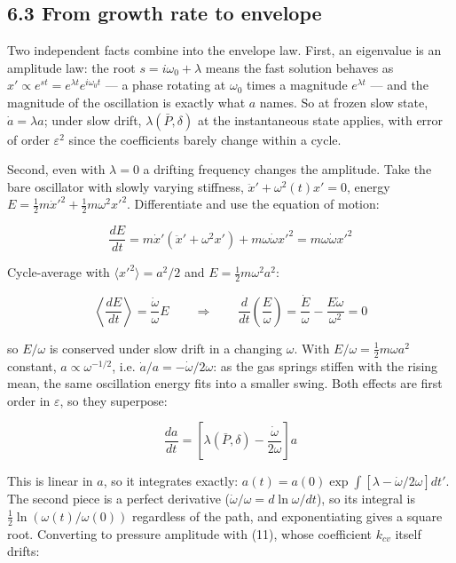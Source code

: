 \documentclass[11pt]{article}
\begin{document}
\subsection*{6.3 From growth rate to envelope}

Two independent facts combine into the envelope law. First, an eigenvalue is an amplitude law: the root $s = i\omega_0 + \lambda$ means the fast solution behaves as $x' \propto e^{st} = e^{\lambda t}e^{i\omega_0 t}$ --- a phase rotating at $\omega_0$ times a magnitude $e^{\lambda t}$ --- and the magnitude of the oscillation is exactly what $a$ names. So at frozen slow state, $\dot a = \lambda a$; under slow drift, $\lambda(\bar P, \delta)$ at the instantaneous state applies, with error of order $\varepsilon^2$ since the coefficients barely change within a cycle.

Second, even with $\lambda = 0$ a drifting frequency changes the amplitude. Take the bare oscillator with slowly varying stiffness, $\ddot x' + \omega^2(t)x' = 0$, energy $E = \frac{1}{2}m\dot x'^2 + \frac{1}{2}m\omega^2x'^2$. Differentiate and use the equation of motion:

\[
\frac{dE}{dt} = m\dot x'\left(\ddot x' + \omega^2x'\right) + m\omega\dot\omega x'^2 = m\omega\dot\omega x'^2
\]

Cycle-average with $\langle x'^2\rangle = a^2/2$ and $E = \frac{1}{2}m\omega^2a^2$:

\[
\left\langle\frac{dE}{dt}\right\rangle = \frac{\dot\omega}{\omega}E \qquad\Longrightarrow\qquad \frac{d}{dt}\left(\frac{E}{\omega}\right) = \frac{\dot E}{\omega} - \frac{E\dot\omega}{\omega^2} = 0
\]

so $E/\omega$ is conserved under slow drift in a changing $\omega$. With $E/\omega = \frac{1}{2}m\omega a^2$ constant, $a \propto \omega^{-1/2}$, i.e. $\dot a/a = -\dot\omega/2\omega$: as the gas springs stiffen with the rising mean, the same oscillation energy fits into a smaller swing. Both effects are first order in $\varepsilon$, so they superpose:

\begin{equation}
\frac{da}{dt} = \left[\lambda(\bar P, \delta) - \frac{\dot\omega}{2\omega}\right]a \tag{21}
\end{equation}

This is linear in $a$, so it integrates exactly: $a(t) = a(0)\exp\int\left[\lambda - \dot\omega/2\omega\right]dt'$. The second piece is a perfect derivative ($\dot\omega/\omega = d\ln\omega/dt$), so its integral is $\frac12\ln(\omega(t)/\omega(0))$ regardless of the path, and exponentiating gives a square root. Converting to pressure amplitude with (11), whose coefficient $k_{cv}$ itself drifts:
\end{document}
